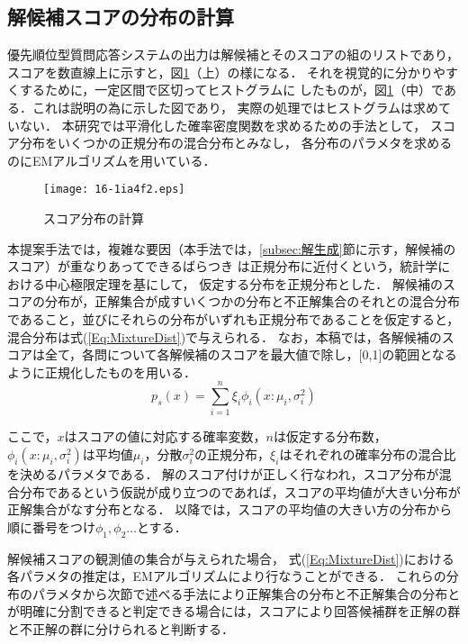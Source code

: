 \documentclass[japanese]{jnlp_1.4}
\begin{document}
\subsection{解候補スコアの分布の計算}\label{sec:分布の計算}

優先順位型質問応答システムの出力は解候補とそのスコアの組のリストであり，
スコアを数直線上に示すと，図\ref{fig:ScoreDensity}（上）の様になる．
それを視覚的に分かりやすくするために，一定区間で区切ってヒストグラムに
したものが，図\ref{fig:ScoreDensity}（中）である．これは説明の為に示した図であり，
実際の処理ではヒストグラムは求めていない．
本研究では平滑化した確率密度関数を求めるための手法として，
スコア分布をいくつかの正規分布の混合分布とみなし，
各分布のパラメタを求めるのにEMアルゴリズムを用いている．

\begin{figure}[t]
\begin{center}
\texttt{[image: 16-1ia4f2.eps]}
\end{center}
\caption{スコア分布の計算}
\label{fig:ScoreDensity}
\vspace{-1\baselineskip}
\end{figure}


本提案手法では，複雑な要因（本手法では，\ref{subsec:解生成}節に示す，解候補のスコア）が重なりあってできるばらつき
は正規分布に近付くという，統計学における中心極限定理を基にして，
仮定する分布を正規分布とした．
解候補のスコアの分布が，正解集合が成すいくつかの分布と不正解集合のそれとの混合分布であること，並びにそれらの分布がいずれも正規分布であることを仮定すると，
混合分布は式(\ref{Eq:MixtureDist})で与えられる．
なお，本稿では，各解候補のスコアは全て，各問について各解候補のスコアを最大値で除し，[0,1]の範囲となるように正規化したものを用いる．
\begin{equation}
p_s(x) = \sum_{i=1}^n \xi_i\phi_i(x:\mu_i,\sigma_i^2)
\label{Eq:MixtureDist}
\end{equation}

ここで，$x$はスコアの値に対応する確率変数，$n$は仮定する分布数，$\phi_i(x:\mu_i,\sigma_i^2)$は平均値$\mu_i$，分散$\sigma_i^2$の正規分布，$\xi_i$はそれぞれの確率分布の混合比を決めるパラメタである．
解のスコア付けが正しく行なわれ，スコア分布が混合分布であるという仮説が成り立つのであれば，スコアの平均値が大きい分布が正解集合がなす分布となる．
以降では，スコアの平均値の大きい方の分布から順に番号をつけ$\phi_1,\phi_2\ldots$とする．

解候補スコアの観測値の集合が与えられた場合，
式(\ref{Eq:MixtureDist})における各パラメタの推定は，EMアルゴリズムにより行なうことができる．
これらの分布のパラメタから次節で述べる手法により正解集合の分布と不正解集合の分布とが明確に分割できると判定できる場合には，スコアにより回答候補群を正解の群と不正解の群に分けられると判断する．
\end{document}
